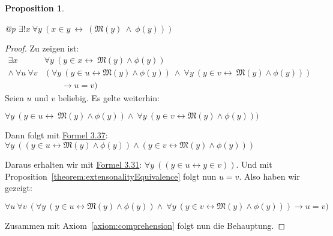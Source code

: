 \documentclass[a4paper,german,10pt,twoside]{book}
\newtheorem{prop}[thm]{Proposition}
\theoremstyle{definition}
\theoremstyle{remark}
\begin{document}
\begin{prop}
\label{theorem:comprehension} \hypertarget{theorem:comprehension}{}
\mbox{}
\begin{longtable}{{@{\extracolsep{\fill}}p{\linewidth}}}
\centering $\exists! x\ \forall y\ (x \in y\ \leftrightarrow \ (\mathfrak{M}(y)\ \land \ \phi(y)))$
\end{longtable}

\end{prop}
\begin{proof}
Zu zeigen ist:
$$
\begin{array}{rl}
\exists x                      & \forall y \ (y \in x \leftrightarrow  \ \mathfrak{M}(y) \land \phi(y)) \\
\land \ \forall u \ \forall v  & (\forall y \ (y \in u \leftrightarrow \mathfrak{M}(y) \land \phi(y)) \ \land  \ \forall y \ ( y \in v \leftrightarrow \ \mathfrak{M}(y) \land \phi(y))) \\
       & \qquad \rightarrow u = v)
\end{array}
$$
Seien $u$ und $v$ beliebig. Es gelte weiterhin:

\par
$\forall y \ (y \in u \leftrightarrow \ \mathfrak{M}(y) \land \phi(y)) \land \ \forall y \ ( y \in v \leftrightarrow \mathfrak{M}(y)
\land \phi(y)))$

\par
Dann folgt mit \hyperref{http://www.qedeq.org/current/doc/math/qedeq_logic_v1_de.pdf}{}{allandpp}{Formel 3.37}: $\forall y \ ((y \in u \leftrightarrow \mathfrak{M}(y) \land \phi(y)) \land (y \in v \leftrightarrow \mathfrak{M}(y) \land \phi(y)))$

\par
Daraus erhalten wir mit \hyperref{http://www.qedeq.org/current/doc/math/qedeq_logic_v1_de.pdf}{}{andequi}{Formel 3.31}: $\forall y \ ((y \in u \leftrightarrow y \in v ))$. Und mit Proposition~\ref{theorem:extensonalityEquivalence} folgt nun $u = v$. Also haben wir gezeigt:

\par
$\forall u \ \forall v \ (\forall y \ (y \in u \leftrightarrow \mathfrak{M}(y) \land \phi(y)) \land \ \forall y \ (y \in v \leftrightarrow \mathfrak{M}(y) \land \phi(y))) \rightarrow u = v)$

\par
Zusammen mit Axiom~\ref{axiom:comprehension} folgt nun die Behauptung.
\end{proof}
\end{document}
